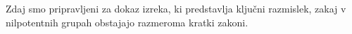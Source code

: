 
Zdaj smo pripravljeni za dokaz izreka, ki predstavlja ključni razmislek, zakaj v nilpotentnih grupah obstajajo razmeroma kratki zakoni.


